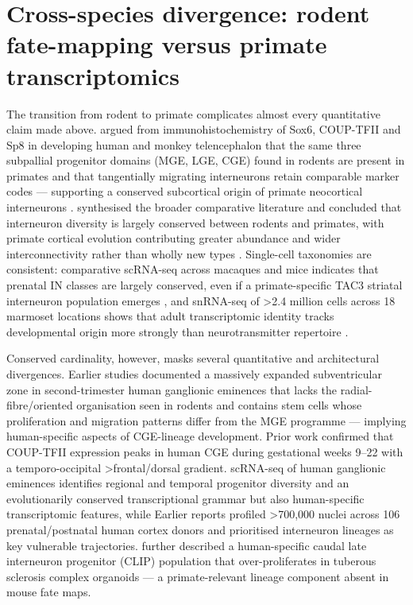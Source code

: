 \documentclass[11pt]{article}
\begin{document}
\section{Cross-species divergence: rodent fate-mapping versus primate transcriptomics}

The transition from rodent to primate complicates almost every quantitative claim made above. \citet{Ma2013} argued from immunohistochemistry of Sox6, COUP-TFII and Sp8 in developing human and monkey telencephalon that the same three subpallial progenitor domains (MGE, LGE, CGE) found in rodents are present in primates and that tangentially migrating interneurons retain comparable marker codes --- supporting a conserved subcortical origin of primate neocortical interneurons \citep{Ma2013}. \citet{Marin2025} synthesised the broader comparative literature and concluded that interneuron diversity is largely conserved between rodents and primates, with primate cortical evolution contributing greater abundance and wider interconnectivity rather than wholly new types \citep{Marin2025}. Single-cell taxonomies are consistent: comparative scRNA-seq across macaques and mice indicates that prenatal IN classes are largely conserved, even if a primate-specific TAC3 striatal interneuron population emerges \citep{Schmitz2022}, and snRNA-seq of \textgreater 2.4 million cells across 18 marmoset locations shows that adult transcriptomic identity tracks developmental origin more strongly than neurotransmitter repertoire \citep{Krienen2023}.

Conserved cardinality, however, masks several quantitative and architectural divergences. Earlier studies \citep{Hansen2013} documented a massively expanded subventricular zone in second-trimester human ganglionic eminences that lacks the radial-fibre/oriented organisation seen in rodents and contains stem cells whose proliferation and migration patterns differ from the MGE programme --- implying human-specific aspects of CGE-lineage development. Prior work \citep{Reinchisi2012} confirmed that COUP-TFII expression peaks in human CGE during gestational weeks 9--22 with a temporo-occipital \textgreater  frontal/dorsal gradient. scRNA-seq of human ganglionic eminences identifies regional and temporal progenitor diversity and an evolutionarily conserved transcriptional grammar but also human-specific transcriptomic features, while Earlier reports \citep{Velmeshev2023} profiled \textgreater 700,000 nuclei across 106 prenatal/postnatal human cortex donors and prioritised interneuron lineages as key vulnerable trajectories. \citet{Eichmuller2022} further described a human-specific caudal late interneuron progenitor (CLIP) population that over-proliferates in tuberous sclerosis complex organoids --- a primate-relevant lineage component absent in mouse fate maps.
\end{document}
